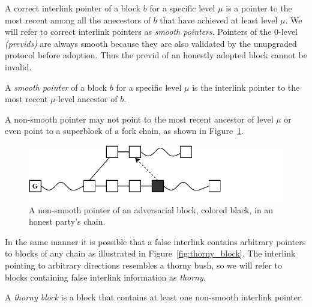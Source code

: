 A correct interlink pointer of a block $b$ for a specific level $\mu$ is a pointer to the most recent among all the anecestors of $b$ that have achieved at least level $\mu$. We will refer to correct interlink pointers as \emph{smooth pointers}. Pointers of the 0-level \textit{(previds)} are always smooth because they are also validated by the unupgraded protocol before adoption. Thus the previd of an
honestly adopted block cannot be invalid.

\begin{definition}
  A \emph{smooth pointer} of a block $b$ for a specific level $\mu$ is the interlink pointer to the most recent $\mu$-level ancestor of $b$.
	\label{defn:smooth_pointer}
\end{definition}

A non-smooth pointer may not point to the most recent ancestor of level $\mu$ or even point to a superblock of a fork chain, as shown in Figure~\ref{fig:false_interlink}.

\begin{figure}[h]
	\begin{center}
		\includegraphics[width=0.9\columnwidth]{figures/false_interlink.pdf}
	\end{center}
    \caption{A non-smooth pointer of an adversarial block, colored black, in an honest party's chain.}
	\label{fig:false_interlink}
\end{figure}

In the same manner it is possible that a false interlink contains arbitrary pointers to blocks of any chain as illustrated in Figure~\ref{fig:thorny_block}. The interlink pointing to arbitrary directions resembles a thorny bush, so we will refer to blocks containing false interlink information as \emph{thorny}.

\begin{definition}
	A \emph{thorny block} is a block that contains at least one non-smooth interlink pointer.
	\label{defn:thorny_block}
\end{definition}

